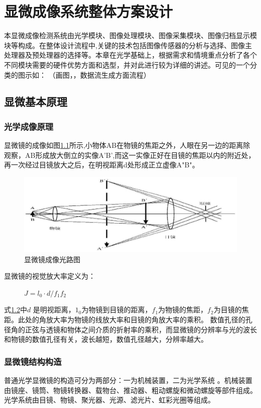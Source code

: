 \chapter{显微成像系统整体方案设计}
本显微成像检测系统由光学模块、图像处理模块、图像采集模块、图像归档显示模块等构成。在整体设计流程中,关键的技术包括图像传感器的分析与选择、图像主处理器及预处理器的选择等。本章在光学基础上，根据需求和情境重点分析了各个不同模块需要的硬件优势方面和选型，并对此进行较为详细的讲述。可见的一个分类的图示如：
（画图，，数据流生成方面流程）

\section{显微基本原理}
\subsection{光学成像原理}

显微镜的成像如图\ref{fig:micro_1}所示,小物体AB在物镜的焦距之外，人眼在另一边的距离除观察，AB形成放大倒立的实像A'B',而这一实像正好在目镜的焦距以内的附近处，再一次经过目镜放大之后，在明视距离d处形成正立虚像A"B"。
\begin{figure}[h]
	\centering
	\includegraphics[width=0.7\linewidth]{Figure/micro_1}
	\caption[显微镜成像光路图]{显微镜成像光路图}
	\label{fig:micro_1}
\end{figure}

显微镜的视觉放大率定义为：

\begin{figure}[h]
\centering
\label{j2}
	$J = l_{0}\cdot d / f_{1}f_{2}$
\end{figure}
式\ref{j2}中$d$ 是明视距离，$1_{0}$为物镜到目镜的距离，$f_{1}$为物镜的焦距，$f_{2}$为目镜的焦距。此处的角放大率为物镜的线放大率和目镜的角放大率的乘积。
数值孔径的孔径角的正弦与透镜和物体之间介质的折射率的乘积，而显微镜的分辨率与光的波长和物镜的数值孔径有关，波长越短，数值孔径越大，分辨率越大。


\subsection{显微镜结构构造}
普通光学显微镜的构造可分为两部分：一为机械装置，二为光学系统 。机械装置由镜座、镜筒、物镜转换器、载物台、推动器、粗动螺旋和微动螺旋等部件组成。光学系统由目镜、物镜、聚光器、光源、滤光片、虹彩光圈等组成。

